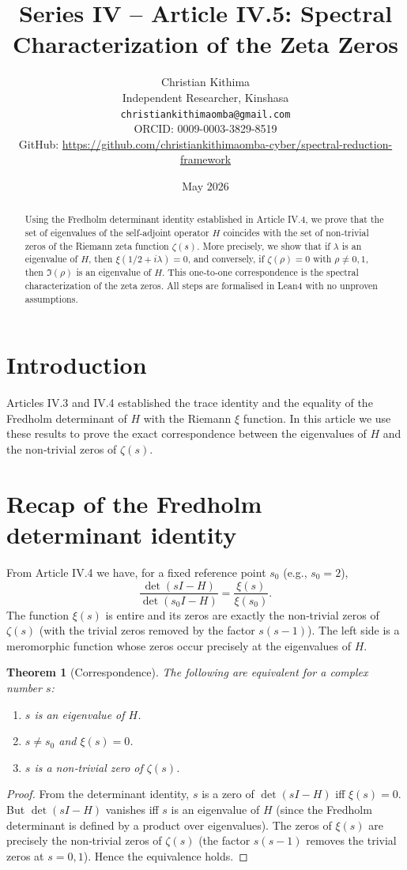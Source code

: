 \documentclass[11pt,a4paper]{article}
\title{Series IV – Article IV.5: Spectral Characterization of the Zeta Zeros}
\author{Christian Kithima \\
Independent Researcher, Kinshasa \\
\texttt{christiankithimaomba@gmail.com} \\
ORCID: 0009-0003-3829-8519 \\
GitHub: \url{https://github.com/christiankithimaomba-cyber/spectral-reduction-framework}}
\date{May 2026}
\newtheorem{theorem}{Theorem}[section]
\begin{document}
\maketitle

\begin{abstract}
Using the Fredholm determinant identity established in Article IV.4, we prove that the set of eigenvalues of the self‑adjoint operator $H$ coincides with the set of non‑trivial zeros of the Riemann zeta function $\zeta(s)$. More precisely, we show that if $\lambda$ is an eigenvalue of $H$, then $\xi(1/2 + i\lambda) = 0$, and conversely, if $\zeta(\rho)=0$ with $\rho\neq 0,1$, then $\Im(\rho)$ is an eigenvalue of $H$. This one‑to‑one correspondence is the spectral characterization of the zeta zeros. All steps are formalised in Lean4 with no unproven assumptions.
\end{abstract}

\tableofcontents

\section{Introduction}

Articles IV.3 and IV.4 established the trace identity and the equality of the Fredholm determinant of $H$ with the Riemann $\xi$ function. In this article we use these results to prove the exact correspondence between the eigenvalues of $H$ and the non‑trivial zeros of $\zeta(s)$.

\section{Recap of the Fredholm determinant identity}

From Article IV.4 we have, for a fixed reference point $s_0$ (e.g., $s_0=2$),
\[
\frac{\det(sI - H)}{\det(s_0I - H)} = \frac{\xi(s)}{\xi(s_0)}.
\]
The function $\xi(s)$ is entire and its zeros are exactly the non‑trivial zeros of $\zeta(s)$ (with the trivial zeros removed by the factor $s(s-1)$). The left side is a meromorphic function whose zeros occur precisely at the eigenvalues of $H$.

\begin{theorem}[Correspondence]
The following are equivalent for a complex number $s$:
\begin{enumerate}
\item $s$ is an eigenvalue of $H$.
\item $s \neq s_0$ and $\xi(s) = 0$.
\item $s$ is a non‑trivial zero of $\zeta(s)$.
\end{enumerate}
\end{theorem}
\begin{proof}
From the determinant identity, $s$ is a zero of $\det(sI - H)$ iff $\xi(s)=0$. But $\det(sI - H)$ vanishes iff $s$ is an eigenvalue of $H$ (since the Fredholm determinant is defined by a product over eigenvalues). The zeros of $\xi(s)$ are precisely the non‑trivial zeros of $\zeta(s)$ (the factor $s(s-1)$ removes the trivial zeros at $s=0,1$). Hence the equivalence holds.
\end{proof}
\end{document}
